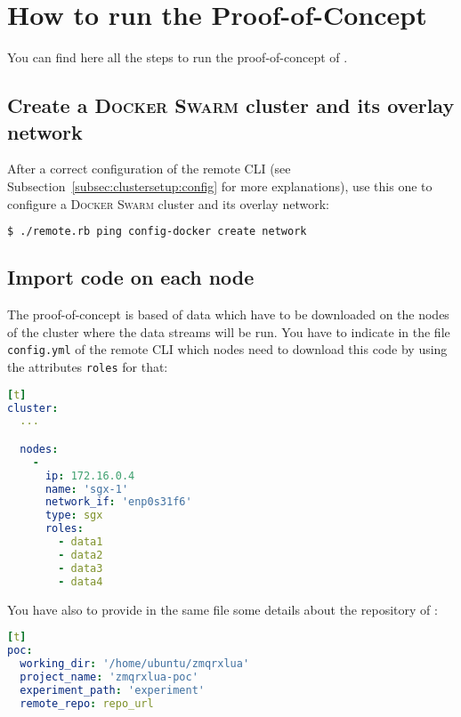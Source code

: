 \section{How to run the Proof-of-Concept}
\label{sec:pocusage}

You can find here all the steps to run the proof-of-concept of \SS{}.


\subsection{Create a \textsc{Docker Swarm} cluster and its overlay network}
\label{subsec:pocusage:init-cluster}

After a correct configuration of the remote CLI (see Subsection~\ref{subsec:clustersetup:config} for more explanations), use this one to configure a \textsc{Docker Swarm} cluster and its overlay network:

\begin{lstlisting}[language=bash, basicstyle=\small]
$ ./remote.rb ping config-docker create network
\end{lstlisting}


\subsection{Import \SS{} code on each node}
\label{subsec:pocusage:import-code}

The proof-of-concept is based of data which have to be downloaded on the nodes of the cluster where the data streams will be run.
You have to indicate in the file \texttt{config.yml} of the remote CLI which nodes need to download this code by using the attributes \texttt{roles} for that:

\begin{lstlisting}[language=YAML,caption={Configure some roles for a node of the cluster},label=node-roles-config][t]
cluster:
  ...

  nodes:
    -
      ip: 172.16.0.4
      name: 'sgx-1'
      network_if: 'enp0s31f6'
      type: sgx
      roles:
        - data1
        - data2
        - data3
        - data4
\end{lstlisting}

You have also to provide in the same file some details about the repository of \SS{}:

\begin{lstlisting}[language=YAML,caption={Configure the repository of \SS{}},label=repo-config][t]
poc:
  working_dir: '/home/ubuntu/zmqrxlua'
  project_name: 'zmqrxlua-poc'
  experiment_path: 'experiment'
  remote_repo: repo_url
\end{lstlisting}

